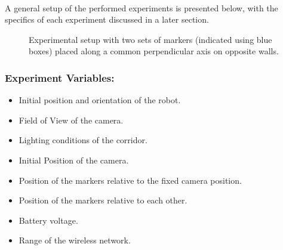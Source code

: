 \paragraph{} A general setup of the performed experiments is presented below, with the specifics of each experiment discussed in a later section.

	\begin{figure}[h!]%
		\centering
		\qquad
		\caption{Experimental setup with two sets of markers (indicated using blue boxes) placed along a common perpendicular axis on opposite walls.}%
		\label{fig:point of view}%
	\end{figure}

\subsubsection*{Experiment Variables:}
\begin{itemize}
	\item Initial position and orientation of the robot.
	\item Field of View of the camera.
	\item Lighting conditions of the corridor.
	\item Initial Position of the camera.
	\item Position of the markers relative to the fixed camera position.
	\item Position of the markers relative to each other.
	\item Battery voltage.
	\item Range of the wireless network.
\end{itemize}

